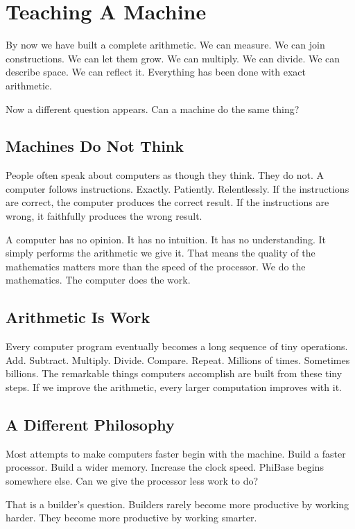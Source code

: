 \chapter{Teaching A Machine}
\label{stone:computer}

By now we have built a complete arithmetic. We can measure. We can join constructions. We can let them grow. We can multiply. We can divide. We can describe space. We can reflect it. Everything has been done with exact arithmetic.

Now a different question appears. Can a machine do the same thing?

\section*{Machines Do Not Think}

People often speak about computers as though they think. They do not. A computer follows instructions. Exactly. Patiently. Relentlessly. If the instructions are correct, the computer produces the correct result. If the instructions are wrong, it faithfully produces the wrong result.

A computer has no opinion. It has no intuition. It has no understanding. It simply performs the arithmetic we give it. That means the quality of the mathematics matters more than the speed of the processor. We do the mathematics. The computer does the work.

\section*{Arithmetic Is Work}

Every computer program eventually becomes a long sequence of tiny operations. Add. Subtract. Multiply. Divide. Compare. Repeat. Millions of times. Sometimes billions. The remarkable things computers accomplish are built from these tiny steps. If we improve the arithmetic, every larger computation improves with it.

\section*{A Different Philosophy}

Most attempts to make computers faster begin with the machine. Build a faster processor. Build a wider memory. Increase the clock speed. PhiBase begins somewhere else. Can we give the processor less work to do?

That is a builder's question. Builders rarely become more productive by working harder. They become more productive by working smarter.

